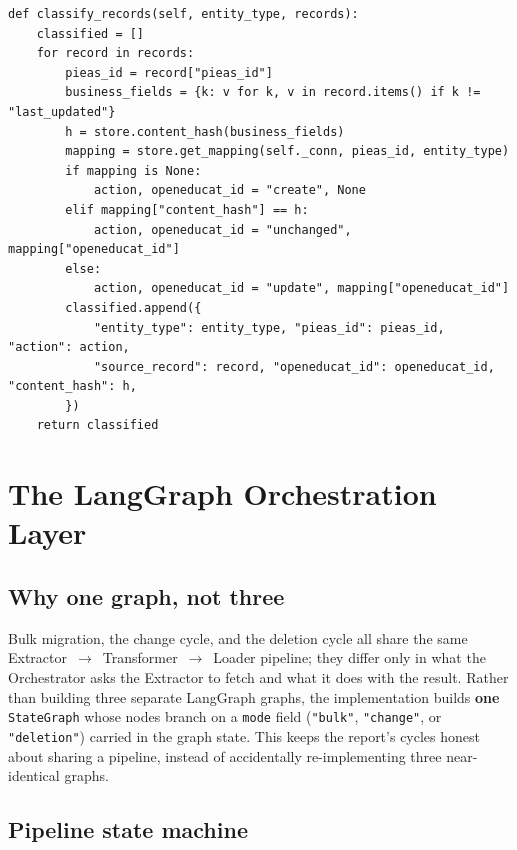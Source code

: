 \documentclass[11pt,a4paper]{article}
\begin{document}
\begin{lstlisting}[caption={Orchestrator record classification (\texttt{agents/orchestrator.py}).}]
def classify_records(self, entity_type, records):
    classified = []
    for record in records:
        pieas_id = record["pieas_id"]
        business_fields = {k: v for k, v in record.items() if k != "last_updated"}
        h = store.content_hash(business_fields)
        mapping = store.get_mapping(self._conn, pieas_id, entity_type)
        if mapping is None:
            action, openeducat_id = "create", None
        elif mapping["content_hash"] == h:
            action, openeducat_id = "unchanged", mapping["openeducat_id"]
        else:
            action, openeducat_id = "update", mapping["openeducat_id"]
        classified.append({
            "entity_type": entity_type, "pieas_id": pieas_id, "action": action,
            "source_record": record, "openeducat_id": openeducat_id, "content_hash": h,
        })
    return classified
\end{lstlisting}

\section{The LangGraph Orchestration Layer}

\subsection{Why one graph, not three}

Bulk migration, the change cycle, and the deletion cycle all share the same
Extractor~$\rightarrow$~Transformer~$\rightarrow$~Loader pipeline; they differ only in what the
Orchestrator asks the Extractor to fetch and what it does with the result. Rather than building
three separate LangGraph graphs, the implementation builds \textbf{one} \texttt{StateGraph}
whose nodes branch on a \texttt{mode} field (\texttt{"bulk"}, \texttt{"change"}, or
\texttt{"deletion"}) carried in the graph state. This keeps the report's cycles honest about
sharing a pipeline, instead of accidentally re-implementing three near-identical graphs.

\subsection{Pipeline state machine}
\end{document}
